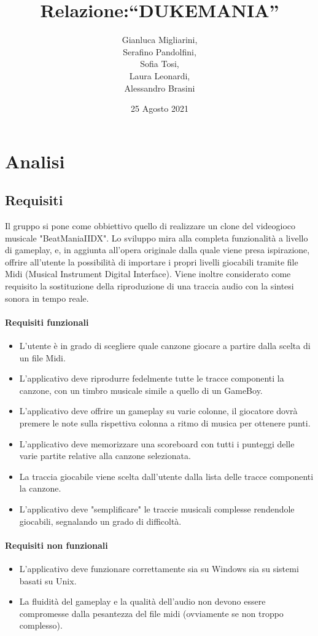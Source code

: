 \documentclass[a4paper,12pt]{report}
\title{Relazione:\break``DUKEMANIA''}
\author{Gianluca Migliarini, \\ Serafino Pandolfini,\\ Sofia Tosi,\\ Laura Leonardi, \\ Alessandro Brasini}
\date{25 Agosto 2021}
\begin{document}
\maketitle
\tableofcontents




\chapter{Analisi}
\section{Requisiti}
Il gruppo si pone come obbiettivo quello di realizzare un clone del videogioco musicale "BeatManiaIIDX".
Lo sviluppo mira alla completa funzionalità a livello di gameplay, e, in aggiunta all'opera originale
dalla quale viene presa ispirazione, offrire all'utente la possibilità di importare i propri livelli giocabili tramite file Midi (Musical Instrument Digital Interface). Viene inoltre considerato come requisito la sostituzione della riproduzione di una traccia audio con la sintesi sonora in tempo reale.
\begingroup
\fontsize{11pt}{10pt}\selectfont

\subsubsection{Requisiti funzionali}
\begin{itemize}
	\item L'utente è in grado di scegliere quale canzone giocare a partire dalla scelta di un file Midi.
	\item L'applicativo deve riprodurre fedelmente tutte le tracce componenti la canzone, con un timbro musicale
	simile a quello di un GameBoy.
	\item L'applicativo deve offrire un gameplay su varie colonne, il giocatore dovrà premere le note sulla rispettiva colonna a ritmo di musica per ottenere punti.
	\item L'applicativo deve memorizzare una scoreboard con tutti i punteggi delle varie partite relative alla canzone selezionata.
	\item La traccia giocabile viene scelta dall'utente dalla lista delle tracce componenti la canzone.
	\item L'applicativo deve "semplificare" le traccie musicali complesse rendendole giocabili, segnalando un grado di difficoltà.
\end{itemize}

\subsubsection{Requisiti non funzionali}
\begin{itemize}
	\item L'applicativo deve funzionare correttamente sia su Windows sia su sistemi basati su Unix.
	\item La fluidità del gameplay e la qualità dell'audio non devono essere compromesse dalla pesantezza del file midi (ovviamente se non troppo complesso).
\end{itemize}
\endgroup
\newpage
\end{document}
